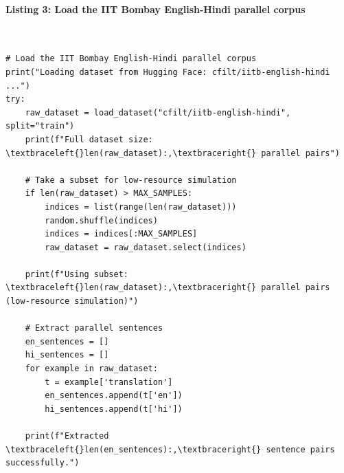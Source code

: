 \documentclass[12pt,a4paper,oneside]{report}
\begin{document}
\paragraph{Listing 3: Load the IIT Bombay English-Hindi parallel corpus}\mbox{}\\[-1ex]
\begin{Verbatim}[commandchars=\\\{\},breaklines=true,breakanywhere=true,fontsize=\scriptsize,frame=leftline,framesep=2mm,rulecolor=\color{gray}]
# Load the IIT Bombay English-Hindi parallel corpus
print("Loading dataset from Hugging Face: cfilt/iitb-english-hindi ...")
try:
    raw_dataset = load_dataset("cfilt/iitb-english-hindi", split="train")
    print(f"Full dataset size: \textbraceleft{}len(raw_dataset):,\textbraceright{} parallel pairs")

    # Take a subset for low-resource simulation
    if len(raw_dataset) > MAX_SAMPLES:
        indices = list(range(len(raw_dataset)))
        random.shuffle(indices)
        indices = indices[:MAX_SAMPLES]
        raw_dataset = raw_dataset.select(indices)

    print(f"Using subset: \textbraceleft{}len(raw_dataset):,\textbraceright{} parallel pairs (low-resource simulation)")

    # Extract parallel sentences
    en_sentences = []
    hi_sentences = []
    for example in raw_dataset:
        t = example['translation']
        en_sentences.append(t['en'])
        hi_sentences.append(t['hi'])

    print(f"Extracted \textbraceleft{}len(en_sentences):,\textbraceright{} sentence pairs successfully.")


\end{Verbatim}
\end{document}
